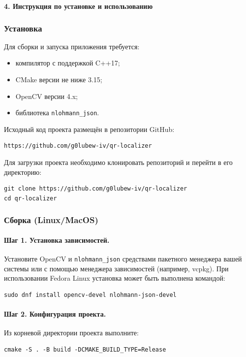 \newpage
\begin{center}
	\textbf{\large 4. Инструкция по установке и использованию}
\end{center}

\subsubsection{Установка}
Для сборки и запуска приложения требуется:
\begin{itemize}
	\item компилятор с поддержкой C++17;
	\item CMake версии не ниже 3.15;
	\item OpenCV версии 4.x;
	\item библиотека \texttt{nlohmann\_json}.
\end{itemize}

Исходный код проекта размещён в репозитории GitHub:
\begin{verbatim}
https://github.com/g0lubew-iv/qr-localizer
\end{verbatim}

Для загрузки проекта необходимо клонировать репозиторий и перейти в его директорию:
\begin{verbatim}
git clone https://github.com/g0lubew-iv/qr-localizer
cd qr-localizer
\end{verbatim}

\subsubsection{Сборка (Linux/MacOS)}
\paragraph{Шаг 1. Установка зависимостей.}
Установите OpenCV и \texttt{nlohmann\_json} средствами пакетного менеджера вашей системы или с помощью менеджера зависимостей (например, vcpkg).
При использовании Fedora Linux установка может быть выполнена командой:
\begin{verbatim}
sudo dnf install opencv-devel nlohmann-json-devel
\end{verbatim}

\paragraph{Шаг 2. Конфигурация проекта.}
Из корневой директории проекта выполните:
\begin{verbatim}
cmake -S . -B build -DCMAKE_BUILD_TYPE=Release
\end{verbatim}


